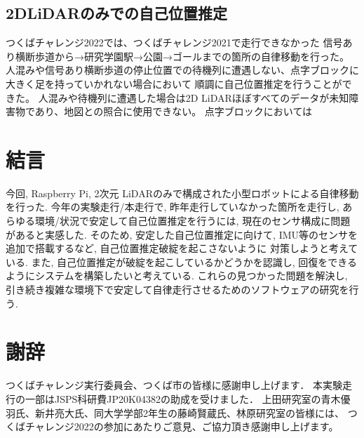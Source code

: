 \documentclass[twocolumn,9pt]{jsproceedings}
\begin{document}
\subsection{2DLiDARのみでの自己位置推定}

つくばチャレンジ2022では、つくばチャレンジ2021で走行できなかった
信号あり横断歩道から→研究学園駅→公園→ゴールまでの箇所の自律移動を行った。
人混みや信号あり横断歩道の停止位置での待機列に遭遇しない、点字ブロックに大きく足を持っていかれない場合において
順調に自己位置推定を行うことができた。
人混みや待機列に遭遇した場合は2D LiDARほぼすべてのデータが未知障害物であり、地図との照合に使用できない。
点字ブロックにおいては

\section{結言}

今回, Raspberry Pi, 2次元 LiDARのみで構成された小型ロボットによる自律移動を行った. 
今年の実験走行/本走行で, 昨年走行していなかった箇所を走行し, 
あらゆる環境/状況で安定して自己位置推定を行うには, 
現在のセンサ構成に問題があると実感した. 
そのため, 安定した自己位置推定に向けて, IMU等のセンサを追加で搭載するなど, 自己位置推定破綻を起こさないように
対策しようと考えている. また, 自己位置推定が破綻を起こしているかどうかを認識し, 
回復をできるようにシステムを構築したいと考えている. 
これらの見つかった問題を解決し, 引き続き複雑な環境下で安定して自律走行させるためのソフトウェアの研究を行う. 

\section*{謝辞}

つくばチャレンジ実行委員会、つくば市の皆様に感謝申し上げます．
本実験走行の一部はJSPS科研費JP20K04382の助成を受けました．
上田研究室の青木優羽氏、新井亮大氏、同大学学部2年生の藤崎賢蔵氏、林原研究室の皆様には、
つくばチャレンジ2022の参加にあたりご意見、ご協力頂き感謝申し上げます。

\end{document}
